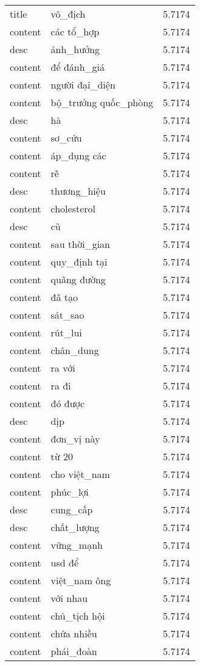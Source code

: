 \documentclass{article}
\begin{document}
\begin{tabular}{lll}
title & vô\_địch & 5.7174\\
content & các tổ\_hợp & 5.7174\\
desc & ảnh\_hưởng & 5.7174\\
content & để đánh\_giá & 5.7174\\
content & người đại\_diện & 5.7174\\
content & bộ\_trưởng quốc\_phòng & 5.7174\\
desc & hà & 5.7174\\
content & sơ\_cứu & 5.7174\\
content & áp\_dụng các & 5.7174\\
content & rẽ & 5.7174\\
desc & thương\_hiệu & 5.7174\\
content & cholesterol & 5.7174\\
desc & cũ & 5.7174\\
content & sau thời\_gian & 5.7174\\
content & quy\_định tại & 5.7174\\
content & quãng đường & 5.7174\\
content & đã tạo & 5.7174\\
content & sát\_sao & 5.7174\\
content & rút\_lui & 5.7174\\
content & chân\_dung & 5.7174\\
content & ra với & 5.7174\\
content & ra đi & 5.7174\\
content & đó được & 5.7174\\
desc & dịp & 5.7174\\
content & đơn\_vị này & 5.7174\\
content & từ 20 & 5.7174\\
content & cho việt\_nam & 5.7174\\
content & phúc\_lợi & 5.7174\\
desc & cung\_cấp & 5.7174\\
desc & chất\_lượng & 5.7174\\
content & vững\_mạnh & 5.7174\\
content & usd để & 5.7174\\
content & việt\_nam ông & 5.7174\\
content & với nhau & 5.7174\\
content & chủ\_tịch hội & 5.7174\\
content & chứa nhiều & 5.7174\\
content & phái\_đoàn & 5.7174\\

\end{tabular}
\end{document}
